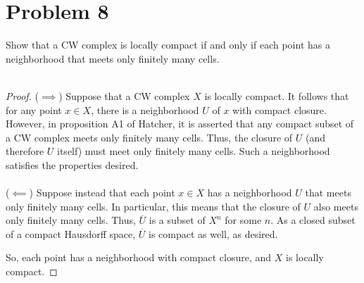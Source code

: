 \documentclass[fontsize=11pt]{scrartcl} %
\numberwithin{equation}{section} %
\numberwithin{figure}{section} %
\numberwithin{table}{section} %
\begin{document}
\section*{Problem 8}
Show that a CW complex is locally compact if and only if each point has a
neighborhood that meets only finitely many cells.
\\
\\
\begin{proof}
    ($\implies$)
    Suppose that a CW complex $X$ is locally compact. It follows that for any
    point $x\in X$, there is a neighborhood $U$ of $x$ with compact closure.
    However, in proposition A1 of Hatcher, it is asserted that any compact
    subset of a CW complex meets only finitely many cells. Thus, the closure of
    $U$ (and therefore $U$ itself) must meet only finitely many cells. Such a
    neighborhood satisfies the properties desired.
    \\
    \\
    ($\impliedby$)
    Suppose instead that each point $x\in X$ has a neighborhood $U$ that meets
    only finitely many cells. In particular, this means that the closure of $U$
    also meets only finitely many cells. Thus, $\overline{U}$ is a subset of
    $X^n$ for some $n$. As a closed subset of a compact Hausdorff space,
    $\overline{U}$ is compact as well, as desired.
    
    So, each point has a neighborhood with compact closure, and $X$ is locally
    compact.
\end{proof}
\end{document}
